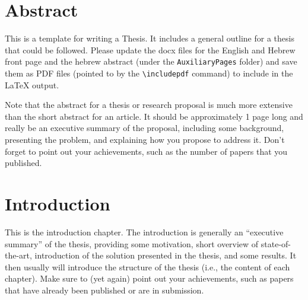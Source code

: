\documentclass[a4paper,12pt,twoside,openany]{book}
\newif\ifproposal
\begin{document}
\pagestyle{fancy}
\fancyhf{} %



\renewcommand{\headrulewidth}{0.4pt}  %

\fancyfoot[C]{\thepage}

\chapter*{Abstract}
    \setcounter{page}{1}
    \color{teal}
        This is a template for writing a Thesis. It includes a general outline for a thesis that could be followed. Please update the docx files for the English and Hebrew front page and the hebrew abstract (under the \texttt{AuxiliaryPages} folder) and save them as PDF files (pointed to by the \texttt{\textbackslash includepdf} command) to include in the LaTeX output.
        
        Note that the abstract for a thesis or research proposal is much more extensive than the short abstract for an article. It should be approximately 1 page long and really be an executive summary of the proposal, including some background, presenting the problem, and explaining how you propose to address it.
        Don't forget to point out your achievements, such as the number of papers that you published.
    \color{black}


\ifproposal
    
    \clearpage
\fi


\mainmatter
\chapter{Introduction}
\label{sec_intro}
\color{teal}
    This is the introduction chapter. The introduction is generally an ``executive summary'' of the thesis, providing some motivation, short overview of state-of-the-art, introduction of the solution presented in the thesis, and some results. It then usually will introduce the structure of the thesis (i.e., the content of each chapter). Make sure to (yet again) point out your achievements, such as papers that have already been published or are in submission.
\end{document}
